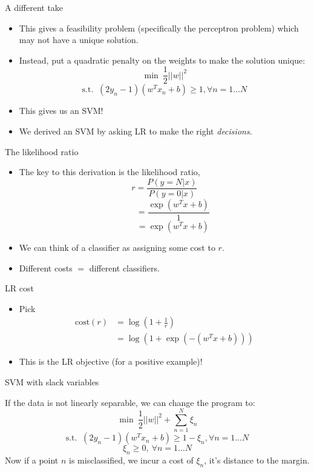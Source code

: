 \documentclass[12pt,notes,mathserif]{beamer}
\providecommand{\tightlist}{%
	\setlength{\itemsep}{0pt}\setlength{\parskip}{0pt}}
\begin{document}
\begin{frame}{A different take}

\begin{itemize}
\item
  This gives a feasibility problem (specifically the perceptron problem)
  which may not have a unique solution.
\item
  Instead, put a quadratic penalty on the weights to make the solution
  unique: \[
  \min\ \frac{1}{2}||w||^{2}
  \]
  \[\textrm{s.t. }\ (2y_{n}-1)(w^{T}x_{n}+b)\geq 1, \forall n=1\ldots N\]
\item
  This gives us an SVM!
\item
  We derived an SVM by asking LR to make the right \emph{decisions}.
\end{itemize}

\end{frame}

\begin{frame}{The likelihood ratio}

\begin{itemize}
\tightlist
\item
  The key to this derivation is the likelihood ratio, \[
  r=\frac{P(y=N|x)}{P(y=0|x)}
  \] \[
  \qquad=\frac{\exp(w^{T}x+b)}{1}
  \] \[
  \qquad=\exp(w^{T}x+b)
  \]
\item
  We can think of a classifier as assigning some cost to \(r.\)
\item
  Different costs \(=\) different classifiers.
\end{itemize}

\end{frame}

\begin{frame}{LR cost}

\begin{itemize}
\tightlist
\item
  Pick\\

  \begin{align*}
  \textrm{cost}(r)&=\displaystyle \log(1+\frac{1}{r}) \\ 
  &=\log(1+\exp(-(w^{T}x+b)))
  \end{align*}
\item
  This is the LR objective (for a positive example)!
\end{itemize}

\end{frame}

\begin{frame}{SVM with slack variables}

If the data is not linearly separable, we can change the program to: \[
\min\ \frac{1}{2}||w||^{2}+\sum_{n=1}^{N}\xi_{n}
\]
\[\textrm{s.t. }\ (2y_{n}-1)(w^{T}x_{n}+b)\geq 1-\xi_{n}, \forall n=1\ldots N\]
\[
\xi_{n}\geq 0,\ \forall n=1\ldots N
\] Now if a point \(n\) is misclassified, we incur a cost of
\(\xi_{n}\), it's distance to the margin.

\end{frame}
\end{document}
